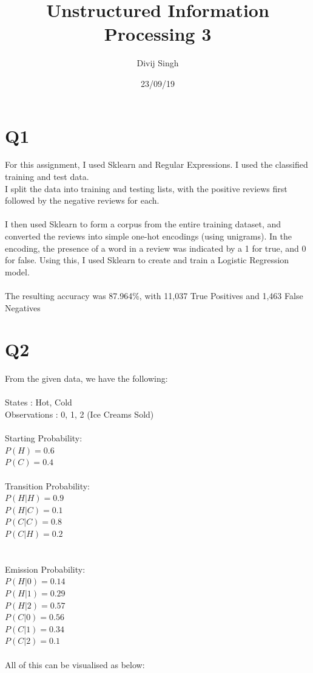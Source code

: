 \documentclass{article}
\title{Unstructured Information Processing 3}
\author{Divij Singh}
\date{23/09/19}
\begin{document}
\maketitle
	
\section{Q1}
For this assignment, I used Sklearn and Regular Expressions. I used the classified training and test data.\\
I split the data into training and testing lists, with the positive reviews first followed by the negative reviews for each.\\\\
I then used Sklearn to form a corpus from the entire training dataset, and converted the reviews into simple one-hot encodings (using unigrams). In the encoding, the presence of a word in a review was indicated by a 1 for true, and 0 for false. Using this, I used Sklearn to create and train a Logistic Regression model.\\\\
The resulting accuracy was 87.964\%, with 11,037 True Positives and 1,463 False Negatives

\section{Q2}
From the given data, we have the following:\\\\
States : Hot, Cold\\
Observations : 0, 1, 2 (Ice Creams Sold)\\\\
Starting Probability: \\$P(H) = 0.6$\\ $P(C) = 0.4$\\\\
Transition Probability: \\ $P(H|H) = 0.9$\\ $P(H|C) = 0.1$\\ $P(C|C) = 0.8$\\ $P(C|H) = 0.2$\\\\\\
Emission Probability: \\$P(H|0) = 0.14$\\$P(H|1) = 0.29$\\$P(H|2) = 0.57$\\$P(C|0) = 0.56$\\$P(C|1) = 0.34$\\$P(C|2) = 0.1$\\\\
All of this can be visualised as below:\\\\
\end{document}
